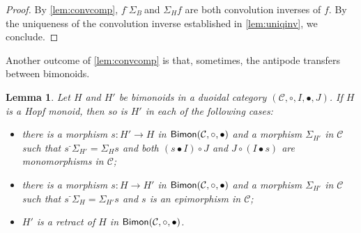 \documentclass[nosumlimits,twoside]{amsart}
\newtheorem{lemma}[lemma]{\sc Lemma}
\theoremstyle{definition}
\theoremstyle{remark}
\def\revsn{\text{-}}
\newcommand{\rd}[1]{{\color{red}{#1}}}
\newcommand{\Cc}{\mathcal{C}}
\def\Bimon{{\sf Bimon}}
\begin{document}
\begin{proof}
 By \cref{lem:convcomp}, $f^{\revsn }\Sigma _{B}\ $and $\Sigma _{H}f$ are both convolution inverses of $f.$ By the uniqueness of the convolution inverse established in \cref{lem:uniqinv}, we conclude.
\end{proof}

Another outcome of \cref{lem:convcomp} is that, sometimes, the antipode transfers between bimonoids.

\begin{lemma}%
\label{lem:retract}
Let $H$ and $H'$ be bimonoids in  a duoidal category $(\Cc,\circ,I,\bullet,J)$. If $H$ is a Hopf monoid, then
so is $H'$ in each of the following cases:
\begin{itemize}
    \item[$i)$] there is a morphism $s:H'\to H$  in $\Bimon(\Cc,\circ,\bullet)$ and a morphism $\Sigma_{H'}$ in $\Cc$
    such that $s^\revsn\Sigma_{H'}=\Sigma_{H}s$ and both $\left( s\bullet I\right) \circ J$ and $J\circ \left( I\bullet s\right)$ are monomorphisms in $\Cc$;
\item[$ii)$] there is a morphism $s:H\to H'$  in $\Bimon(\Cc,\circ,\bullet)$ and a morphism $\Sigma_{H'}$ in $\Cc$
    such that $s^\revsn\Sigma_{H}=\Sigma_{H'}s$ and $s$ is an epimorphism in $\Cc$;  
    \item[$iii)$] $H'$ is a retract of $H$ in $\Bimon(\Cc,\circ,\bullet)$.
\end{itemize}
\end{lemma}
\end{document}
